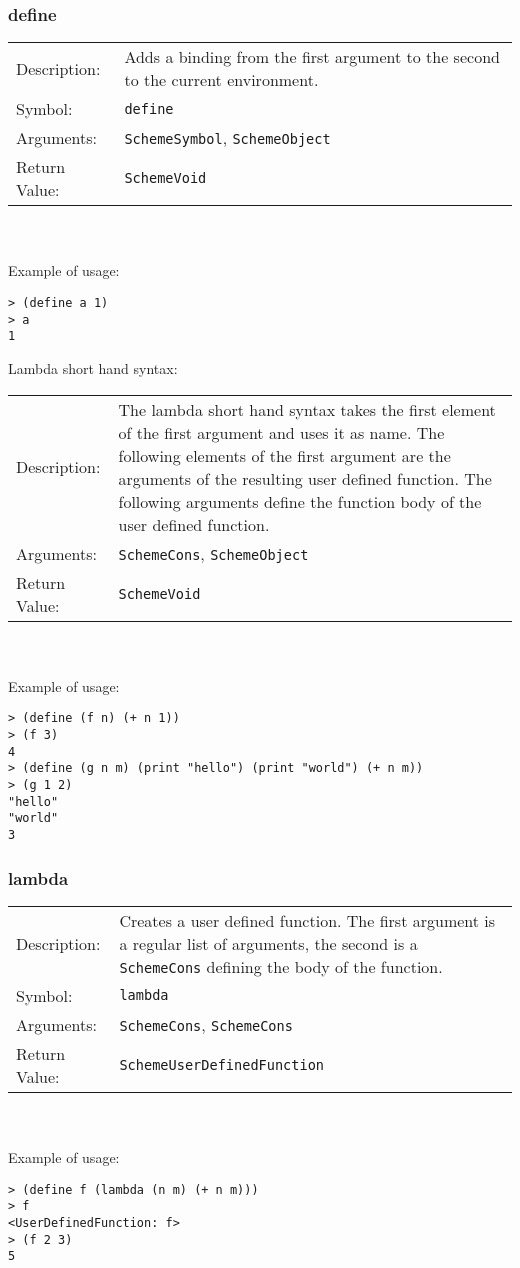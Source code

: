 \documentclass[12pt,a4paper]{scrartcl}
\begin{document}
\subsubsection{define}
\begin{tabular}{l  p{13cm}}
Description: & Adds a binding from the first argument to the second to the current environment.\\
Symbol: & \lstinline{define}\\
Arguments: & \lstinline{SchemeSymbol}, \lstinline{SchemeObject}\\
Return Value: & \lstinline{SchemeVoid}\\
\end{tabular}
\\
\\
Example of usage:
\begin{lstlisting}
> (define a 1)
> a
1
\end{lstlisting}

Lambda short hand syntax:\\
\begin{tabular}{l  p{13cm}}
Description: & The lambda short hand syntax takes the first element of the first argument and uses it as name. The following elements of the first argument are the arguments of the resulting user defined function. The following arguments define the function body of the user defined function.\\
Arguments: & \lstinline{SchemeCons}, \lstinline{SchemeObject}\\
Return Value: & \lstinline{SchemeVoid}\\
\end{tabular}\\
\\
Example of usage:
\begin{lstlisting}
> (define (f n) (+ n 1))
> (f 3)
4
> (define (g n m) (print "hello") (print "world") (+ n m))
> (g 1 2)
"hello"
"world"
3
\end{lstlisting}

\subsubsection{lambda}
\begin{tabular}{l  p{13cm}}
Description: & Creates a user defined function. The first argument is a regular list of arguments, the second is a \lstinline{SchemeCons} defining the body of the function.\\
Symbol: & \lstinline{lambda}\\
Arguments: & \lstinline{SchemeCons}, \lstinline{SchemeCons}\\
Return Value: & \lstinline{SchemeUserDefinedFunction}\\
\end{tabular}
\\
\\
Example of usage:
\begin{lstlisting}
> (define f (lambda (n m) (+ n m)))
> f
<UserDefinedFunction: f> 
> (f 2 3)
5
\end{lstlisting}
\end{document}
